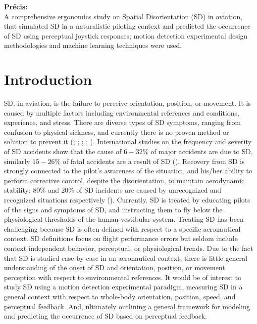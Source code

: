 \documentclass[11pt, onecolumn]{article}
\begin{document}
\vspace{0.1cm}
\noindent
{\bf Précis:}\\  %
A comprehensive ergonomics study on Spatial Disorientation (SD) in aviation, that simulated SD in a naturalistic piloting context and predicted the occurrence of SD using perceptual joystick responses; motion detection experimental design methodologies and machine learning techniques were used. 


\section{Introduction}
SD, in aviation, is the failure to perceive orientation, position, or movement. It is caused by multiple factors including environmental references and conditions, experience, and stress.  There are diverse types of SD symptoms, ranging from confusion to physical sickness, and currently there is no proven method or solution to prevent it (\cite{Bles_2008_SD}; \cite{Gibb_2010_Aviation}; \cite{Perdriel_1980_SD}; \cite{Previc_2004_Spatial}; \cite{Newman_2007_SD}).  International studies on the frequency and severity of SD accidents show that the cause of $6-32\%$ of major accidents are due to SD, similarly $15-26\%$ of fatal accidents are a result of SD (\cite{Newman_2007_SD}).  Recovery from SD is strongly connected to the pilot's awareness of the situation, and his/her ability to perform corrective control, despite the disorientation, to maintain aerodynamic stability; $80\%$ and $20\%$ of SD incidents are caused by unrecognized and recognized situations respectively (\cite{Bles_2008_SD}).  Currently, SD is treated by educating pilots of the signs and symptoms of SD, and instructing them to fly below the physiological thresholds of the human vestibular system.  Treating SD has been challenging because SD is often defined with respect to a specific aeronautical context. SD definitions focus on flight performance errors but seldom include context independent behavior, perceptual, or physiological trends.  Due to the fact that SD is studied case-by-case in an aeronautical context, there is little general understanding of the onset of SD and orientation, position, or movement perception with respect to environmental references.  It would be of interest to study SD using a motion detection experimental paradigm, measuring SD in a general context with respect to whole-body orientation, position, speed, and perceptual feedback.  And, ultimately outlining a general framework for modeling and predicting the occurrence of SD based on perceptual feedback.
\end{document}
